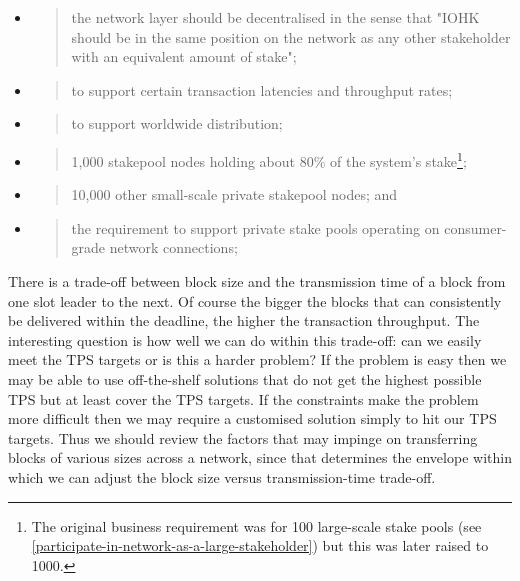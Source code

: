 \documentclass[11pt,a4paper]{article}
\begin{document}
\begin{itemize}
\item
  \begin{quote}
  the network layer should be decentralised in the sense that "IOHK
  should be in the same position on the network as any other stakeholder
  with an equivalent amount of stake";
  \end{quote}
\item
  \begin{quote}
  to support certain transaction latencies and throughput rates;
  \end{quote}
\item
  \begin{quote}
  to support worldwide distribution;
  \end{quote}
\item
  \begin{quote}
  1,000 stakepool nodes holding about 80\% of the system's
  stake\footnote{The original business requirement was for 100
    large-scale stake pools (see
    \cref{participate-in-network-as-a-large-stakeholder}) but this was
    later raised to 1000.};
  \end{quote}
\item
  \begin{quote}
  10,000 other small-scale private stakepool nodes; and
  \end{quote}
\item
  \begin{quote}
  the requirement to support private stake pools operating on
  consumer-grade network connections;
  \end{quote}
\end{itemize}

There is a trade-off between block size and the transmission time of a
block from one slot leader to the next. Of course the bigger the blocks
that can consistently be delivered within the deadline, the higher the
transaction throughput. The interesting question is how well we can do
within this trade-off: can we easily meet the TPS targets or is this a
harder problem? If the problem is easy then we may be able to use
off-the-shelf solutions that do not get the highest possible TPS but at
least cover the TPS targets. If the constraints make the problem more
difficult then we may require a customised solution simply to hit our
TPS targets. Thus we should review the factors that may impinge on
transferring blocks of various sizes across a network, since that
determines the envelope within which we can adjust the block size versus
transmission-time trade-off.
\end{document}
